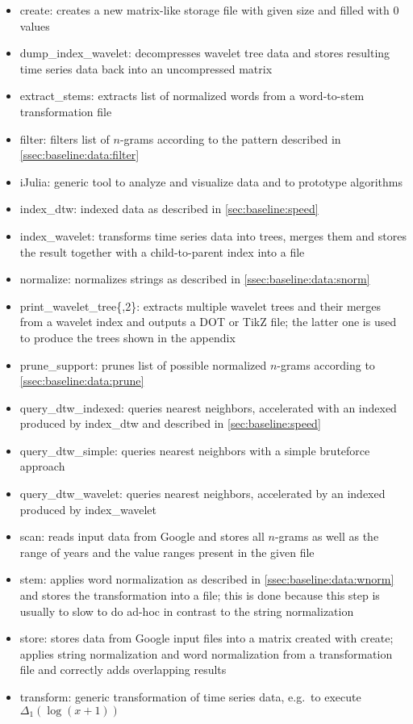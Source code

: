 \begin{itemize}
    \item create: creates a new matrix-like storage file with given size and filled with $0$ values
    \item dump\_index\_wavelet: decompresses wavelet tree data and stores resulting time series data back into an uncompressed matrix
    \item extract\_stems: extracts list of normalized words from a word-to-stem transformation file
    \item filter: filters list of $n$-grams according to the pattern described in \autoref{ssec:baseline:data:filter}
    \item iJulia: generic tool to analyze and visualize data and to prototype algorithms
    \item index\_dtw: indexed data as described in \autoref{sec:baseline:speed}
    \item index\_wavelet: transforms time series data into trees, merges them and stores the result together with a child-to-parent index into a file
    \item normalize: normalizes strings as described in \autoref{ssec:baseline:data:snorm}
    \item print\_wavelet\_tree\{,2\}: extracts multiple wavelet trees and their merges from a wavelet index and outputs a DOT or TikZ file; the latter one is used to produce the trees shown in the appendix
    \item prune\_support: prunes list of possible normalized $n$-grams according to \autoref{ssec:baseline:data:prune}
    \item query\_dtw\_indexed: queries nearest neighbors, accelerated with an indexed produced by index\_dtw and described in \autoref{sec:baseline:speed}
    \item query\_dtw\_simple: queries nearest neighbors with a simple bruteforce approach
    \item query\_dtw\_wavelet: queries nearest neighbors, accelerated by an indexed produced by index\_wavelet
    \item scan: reads input data from Google and stores all $n$-grams as well as the range of years and the value ranges present in the given file
    \item stem: applies word normalization as described in \autoref{ssec:baseline:data:wnorm} and stores the transformation into a file; this is done because this step is usually to slow to do ad-hoc in contrast to the string normalization
    \item store: stores data from Google input files into a matrix created with create; applies string normalization and word normalization from a transformation file and correctly adds overlapping results
    \item transform: generic transformation of time series data, e.g.\ to execute $\Delta_1(\log(x + 1))$
\end{itemize}

